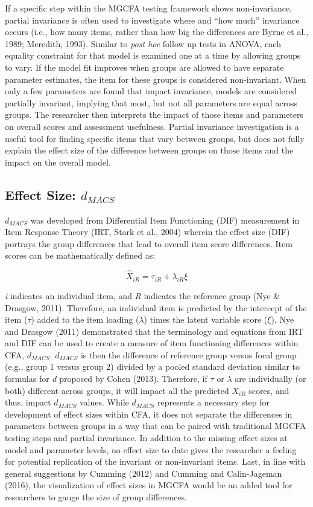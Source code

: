\documentclass[
  man]{apa7}
\begin{document}
If a specific step within the MGCFA testing framework shows non-invariance, partial invariance is often used to investigate where and ``how much'' invariance occurs (i.e., how many items, rather than how big the differences are Byrne et al., 1989; Meredith, 1993). Similar to \emph{post hoc} follow up tests in ANOVA, each equality constraint for that model is examined one at a time by allowing groups to vary. If the model fit improves when groups are allowed to have separate parameter estimates, the item for these groups is considered non-invariant. When only a few parameters are found that impact invariance, models are considered partially invariant, implying that most, but not all parameters are equal across groups. The researcher then interprets the impact of those items and parameters on overall scores and assessment usefulness. Partial invariance investigation is a useful tool for finding specific items that vary between groups, but does not fully explain the effect size of the difference between groups on those items and the impact on the overall model.

\subsection{\texorpdfstring{Effect Size: \(d_{MACS}\)}{Effect Size: d\_\{MACS\}}}\label{effect-size-d_macs}

\(d_{MACS}\) was developed from Differential Item Functioning (DIF) measurement in Item Response Theory (IRT, Stark et al., 2004) wherein the effect size (DIF) portrays the group differences that lead to overall item score differences. Item scores can be mathematically defined as:

\[
\hat{X}_{iR} = \tau_{iR} + \lambda_{iR}\xi
\]

\emph{i} indicates an individual item, and \emph{R} indicates the reference group (Nye \& Drasgow, 2011). Therefore, an individual item is predicted by the intercept of the item (\(\tau\)) added to the item loading (\(\lambda\)) times the latent variable score (\(\xi\)). Nye and Drasgow (2011) demonstrated that the terminology and equations from IRT and DIF can be used to create a measure of item functioning differences within CFA, \(d_{MACS}\). \(d_{MACS}\) is then the difference of reference group versus focal group (e.g., group 1 versus group 2) divided by a pooled standard deviation similar to formulas for \emph{d} proposed by Cohen (2013). Therefore, if \(\tau\) or \(\lambda\) are individually (or both) different across groups, it will impact all the predicted \(X_{iR}\) scores, and thus, impact \(d_{MACS}\) values. While \(d_{MACS}\) represents a necessary step for development of effect sizes within CFA, it does not separate the differences in parameters between groups in a way that can be paired with traditional MGCFA testing steps and partial invariance. In addition to the missing effect sizes at model and parameter levels, no effect size to date gives the researcher a feeling for potential replication of the invariant or non-invariant items. Last, in line with general suggestions by Cumming (2012) and Cumming and Calin-Jageman (2016), the visualization of effect sizes in MGCFA would be an added tool for researchers to gauge the size of group differences.
\end{document}
